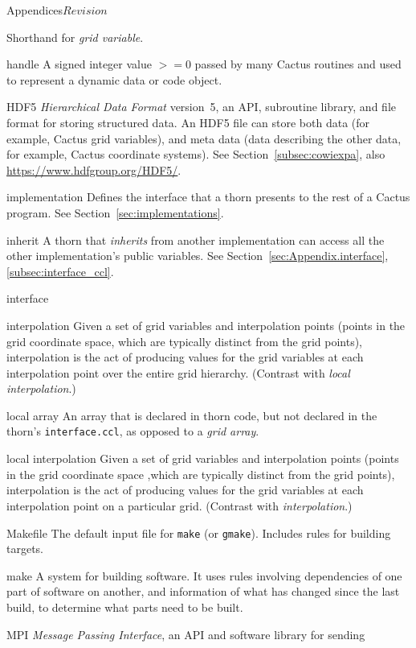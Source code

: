\begin{cactuspart}{Appendices}{}{$Revision$}
\begin{Lentry}
  Shorthand for \textit{grid variable}.
\item[handle]
  A signed integer value $>= 0$ passed by many Cactus routines and
  used to represent a dynamic data or code object.
\item[HDF5]
  \textit{Hierarchical Data Format} version~5, an API, subroutine library, and
  file format for storing structured data.  An HDF5 file can
  store both data (for example, Cactus grid variables), and meta data
  (data describing the other data, for example, Cactus coordinate
  systems).
  See Section~\ref{subsec:cowiexpa}, also
  \url{https://www.hdfgroup.org/HDF5/}.
\item[implementation]
  Defines the interface that a thorn presents to the rest of a Cactus program.
  See Section~\ref{sec:implementations}.
\item[inherit] A thorn that \textit{inherits} from another implementation
  can access all the other implementation's public variables.
  See Section~\ref{sec:Appendix.interface}, \ref{subsec:interface_ccl}.
\item[interface]
\item[interpolation]
  Given a set of grid variables and interpolation points (points in the
  grid coordinate space, which are typically distinct from the grid points),
  interpolation is the act of producing values for the grid variables 
  at each interpolation point over the entire grid hierarchy.  
  (Contrast with \textit{local interpolation}.)
\item[local array]
  An array that is declared in thorn code, but not declared in the thorn's
  \verb|interface.ccl|, as opposed to a \textit{grid array}.
\item[local interpolation]
  Given a set of grid variables and interpolation points (points in the
  grid coordinate space ,which are typically distinct from the grid points),
  interpolation is the act of producing values for the grid variables
  at each interpolation point on a particular grid.  
  (Contrast with \textit{interpolation}.)
\item[Makefile]
  The default input file for \texttt{make} (or \texttt{gmake}).  Includes
  rules for building targets.
\item[make] A system for building software.  It uses rules involving
  dependencies of one part of software on another, and information of what
  has changed since the last build, to determine what parts need to be
  built.
\item[MPI]
  \textit{Message Passing Interface}, an API and software library for sending

\end{Lentry}
\end{cactuspart}
